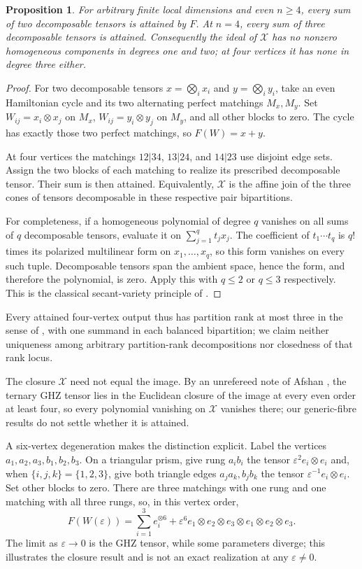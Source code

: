 \documentclass[11pt]{article}
\newtheorem{proposition}[theorem]{Proposition}
\theoremstyle{remark}\newtheorem{remark}[theorem]{Remark}
\newcommand{\cX}{\mathcal X}
\begin{document}
\begin{proposition}\label{prop:secant}
For arbitrary finite local dimensions and even $n\geq4$, every sum of two decomposable tensors is attained by $F$. At $n=4$, every sum of three decomposable tensors is attained. Consequently the ideal of $\cX$ has no nonzero homogeneous components in degrees one and two; at four vertices it has none in degree three either.
\end{proposition}
\begin{proof}
For two decomposable tensors $x=\bigotimes_i x_i$ and $y=\bigotimes_i y_i$, take an even Hamiltonian cycle and its two alternating perfect matchings $M_x,M_y$. Set $W_{ij}=x_i\otimes x_j$ on $M_x$, $W_{ij}=y_i\otimes y_j$ on $M_y$, and all other blocks to zero. The cycle has exactly those two perfect matchings, so $F(W)=x+y$.

At four vertices the matchings $12|34$, $13|24$, and $14|23$ use disjoint edge sets. Assign the two blocks of each matching to realize its prescribed decomposable tensor. Their sum is then attained. Equivalently, $\cX$ is the affine join of the three cones of tensors decomposable in these respective pair bipartitions.

For completeness, if a homogeneous polynomial of degree $q$ vanishes on all sums of $q$ decomposable tensors, evaluate it on $\sum_{j=1}^q t_jx_j$. The coefficient of $t_1\cdots t_q$ is $q!$ times its polarized multilinear form on $x_1,\ldots,x_q$, so this form vanishes on every such tuple. Decomposable tensors span the ambient space, hence the form, and therefore the polynomial, is zero. Apply this with $q\leq2$ or $q\leq3$ respectively. This is the classical secant-variety principle of \cite[Lemma 3.1]{lm}.
\end{proof}

Every attained four-vertex output thus has partition rank at most three
in the sense of \cite{naslund}, with one summand in each balanced
bipartition; we claim neither uniqueness among arbitrary partition-rank
decompositions nor closedness of that rank locus.

The closure $\cX$ need not equal the image. By an unrefereed note
of Afshan \cite{closure}, the ternary GHZ tensor lies in the Euclidean
closure of the image at every even order at least four, so every
polynomial vanishing on $\cX$ vanishes there; our generic-fibre results
do not settle whether it is attained.

A six-vertex degeneration makes the distinction explicit. Label the vertices $a_1,a_2,a_3,b_1,b_2,b_3$. On a triangular prism, give rung $a_ib_i$ the tensor $\varepsilon^2 e_i\otimes e_i$ and, when $\{i,j,k\}=\{1,2,3\}$, give both triangle edges $a_ja_k,b_jb_k$ the tensor $\varepsilon^{-1}e_i\otimes e_i$. Set other blocks to zero. There are three matchings with one rung and one matching with all three rungs, so, in this vertex order,
\[
 F(W(\varepsilon))=
 \sum_{i=1}^3e_i^{\otimes6}
 +\varepsilon^6e_1\otimes e_2\otimes e_3\otimes e_1\otimes e_2\otimes e_3.
\]
The limit as $\varepsilon\to0$ is the GHZ tensor, while some parameters
diverge; this illustrates the closure result and is not an exact
realization at any $\varepsilon\ne0$.
\end{document}
